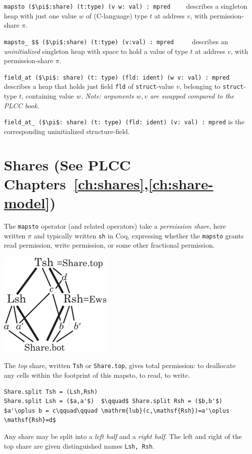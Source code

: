 \documentclass[12pt,fleqn,openany,oneside,showtrims]{memoir}
\newcommand{\ychapter}[2]{\chapter[#1]{#1 \hfill \normalsize #2}}
\begin{document}
\noindent \lstinline{mapsto ($\pi$:share) (t:type) (v w: val) : mpred}
$\qquad$describes a singleton heap with
just one value $w$ of (C-language) type $t$
at address $v$, with permission-share $\pi$.

\noindent \lstinline{mapsto_ $$ ($\pi$:share) (t:type) (v:val) : mpred}
$\qquad$
describes an \emph{uninitialized} singleton heap with
space to hold a value of type $t$
at address $v$, with permission-share $\pi$.

\noindent
\lstinline{field_at ($\pi$: share) (t: type) (fld: ident) (w v: val) : mpred}
\newline  describes a heap
that holds just field \lstinline{fld} 
of \lstinline{struct}-value $v$,
belonging to \lstinline{struct}-type $t$, 
containing value $w$.
\emph{Note: arguments $w,v$ are swapped compared to the PLCC book.}

\lstinline{field_at_ ($\pi$: share) (t: type) (fld: ident) (v: val) : mpred}
\newline is the corresponding uninitialized structure-field.

\ychapter{Shares}{(See PLCC Chapters~\ref{ch:shares},\ref{ch:share-model})}
The \lstinline{mapsto} operator (and related operators) take a
\emph{permission share}, here written $\pi$ and typically
written \lstinline{sh} in Coq, expressing whether
the \lstinline{mapsto} grants read permission, write permission,
or some other fractional permission.

\centerline{\includegraphics[scale=1.25]{graphics/shares.pdf}}

The \emph{top} share, written \lstinline{Tsh} or
\lstinline{Share.top}, gives total permission: to deallocate any cells
within the footprint of this mapsto, to read, to write.

\begin{lstlisting}
Share.split Tsh = (Lsh,Rsh)
Share.split Lsh = ($a,a'$)  $\qquad$ Share.split Rsh = ($b,b'$)
$a'\oplus b = c\qquad\qquad \mathrm{lub}(c,\mathsf{Rsh})=a'\oplus \mathsf{Rsh}=d$
\end{lstlisting}
Any share may be split into a \emph{left half} and a \emph{right half}.
The left and right of the top share are given distinguished names
\lstinline{Lsh, Rsh}.
\end{document}
